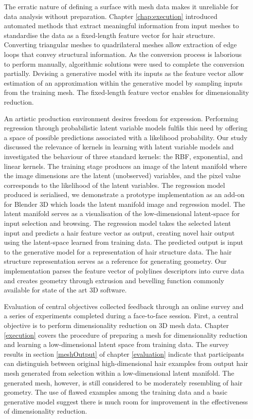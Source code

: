 \documentclass[ %
author={Dillon Keith Diep},
supervisor={Dr. Carl Henrik Ek},
degree={MEng},
title={ART-CG Hair:},
subtitle={Assisted Real-time Content Generation of Stylised Virtual Hair},
type={Research},
year={2017} ]{dissertation}
\begin{document}
The erratic nature of defining a surface with mesh data makes it unreliable for data analysis without preparation.
Chapter \ref{chap:execution} introduced automated methods that extract meaningful information from input meshes to standardise the data as a fixed-length feature vector for hair structure.
Converting triangular meshes to quadrilateral meshes allow extraction of edge loops that convey structural information. As the conversion process is laborious to perform manually, algorithmic solutions were used to complete the conversion partially.
Devising a generative model with its inputs as the feature vector allow estimation of an approximation within the generative model by sampling inputs from the training mesh.
The fixed-length feature vector enables for dimensionality reduction.

An artistic production environment desires freedom for expression. Performing regression through probabilistic latent variable models fulfils this need by offering a space of possible predictions associated with a likelihood probability.
Our study discussed the relevance of kernels in learning with latent variable models and investigated the behaviour of three standard kernels: the RBF, exponential, and linear kernels.
The training stage produces an image of the latent manifold where the image dimensions are the latent (unobserved) variables, and the pixel value corresponds to the likelihood of the latent variables.
The regression model produced is serialised, we demonstrate a prototype implementation as an add-on for Blender 3D which loads the latent manifold image and regression model. The latent manifold serves as a visualisation of the low-dimensional latent-space for input selection and browsing. The regression model takes the selected latent input and predicts a hair feature vector as output, creating novel hair output using the latent-space learned from training data.
The predicted output is input to the generative model for a representation of hair structure data. 
The hair structure representation serves as a reference for generating geometry.
Our implementation parses the feature vector of polylines descriptors into curve data and creates geometry through extrusion and bevelling function commonly available for state of the art 3D software.

Evaluation of central objectives collected feedback through an online survey and a series of experiments completed during a face-to-face session. 
First, a central objective is to perform dimensionality reduction on 3D mesh data.
Chapter \ref{execution} covers the procedure of preparing a mesh for dimensionality reduction and learning a low-dimensional latent space from training data.
The survey results in section \ref{meshOutput} of chapter \ref{evaluation} indicate that participants can distinguish between original high-dimensional hair examples from output hair mesh generated from selection within a low-dimensional latent manifold. The generated mesh, however, is still considered to be moderately resembling of hair geometry. The use of flawed examples among the training data and a basic generative model suggest there is much room for improvement in the effectiveness of dimensionality reduction.
\end{document}
